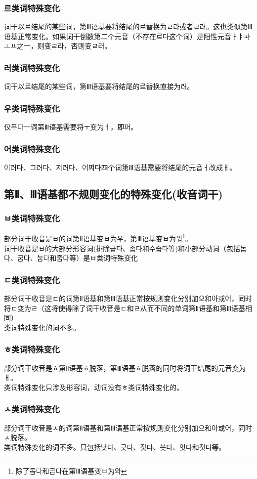\subsubsection{{\kr 르}类词特殊变化}%
词干以{\kr 르}结尾的某些词，第Ⅲ语基要将结尾的{\kr 르}替换为{\kr ㄹ라}或者{\kr ㄹ러}。这也类似第Ⅲ语基正常变化。如果词干倒数第二个元音（不存在{\kr 르다}这个词）是阳性元音{\kr ㅏㅑㅘㅗㅛ}之一，则变{\kr ㄹ라}，否则变{\kr ㄹ러}。
\subsubsection{{\kr 러}类词特殊变化}%
词干以{\kr 르}结尾的某些词，第Ⅲ语基要将结尾的{\kr 르}替换直接为{\kr 러}。
\subsubsection{{\kr 우}类词特殊变化}\label{eogi:u}
仅{\kr 푸다}一词第Ⅲ语基需要将{\kr ㅜ}变为{\kr ㅓ}，即{\kr 퍼}。
\subsubsection{{\kr 어}类词特殊变化}\label{eogi:eo}
{\kr 이러다}、{\kr 그러다}、{\kr 저러다}、{\kr 어쩌다}四个词第Ⅲ语基需要将结尾的元音{\kr ㅓ}改成{\kr ㅐ}。
\subsection{第Ⅱ、Ⅲ语基都不规则变化的特殊变化(收音词干)}
\subsubsection{{\kr ㅂ}类词特殊变化}
部分词干收音是{\kr ㅂ}的词第Ⅱ语基变{\kr ㅂ}为{\kr 우}，第Ⅲ语基变{\kr ㅂ}为{\kr 워}\footnote{除了{\kr 돕다}和{\kr 곱다}在第Ⅲ语基变{\kr ㅂ}为{\kr 와}}。
\\\indent 词干收音是{\kr ㅂ}的大部分形容词(排除{\kr 굽다、좁다}和{\kr 수줍다}等)和小部分动词（包括{\kr 돕다、굽다、눕다}和{\kr 줍다}等）是{\kr ㅂ}类词特殊变化
\subsubsection{{\kr ㄷ}类词特殊变化}
部分词干收音是{\kr ㄷ}的词第Ⅱ语基和第Ⅲ语基正常按规则变化分别加{\kr 으}和{\kr 아}或{\kr 어}，同时将{\kr ㄷ}变为{\kr ㄹ}（这将使得除了词干收音是{\kr ㄷ}和{\kr ㄹ}从而不同的单词第Ⅱ语基和第Ⅲ语基相同）
\\类词特殊变化的词不多。
\subsubsection{{\kr ㅎ}类词特殊变化}
部分词干收音是{\kr ㅎ}第Ⅱ语基{\kr ㅎ}脱落，第Ⅲ语基{\kr ㅎ}脱落的同时将词干结尾的元音变为{\kr ㅐ}。
\\类词特殊变化只涉及形容词，动词没有{\kr ㅎ}类词特殊变化的。
\subsubsection{{\kr ㅅ}类词特殊变化}
部分词干收音是{\kr ㅅ}的词第Ⅱ语基和第Ⅲ语基正常按规则变化分别加{\kr 으}和{\kr 아}或{\kr 어}，同时{\kr ㅅ}脱落。
\\类词特殊变化的词不多。只包括{\kr 낫다、긋다、짓다、붓다、잇다}和{\kr 젓다}等。
